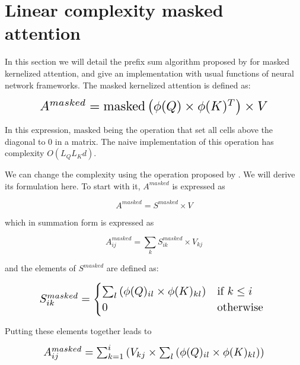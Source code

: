 \section{Linear complexity masked attention}

In this section we will detail the prefix sum algorithm proposed by
\citet{choromanski2021rethinking} for
 masked kernelized attention, and give an implementation with usual
functions of neural network frameworks. The masked kernelized attention is defined as:

\begin{equation}
\resizebox{0.8\hsize}{!}{$
	A^{masked} = \mathrm{masked} \left( \phi(Q) \times \phi(K)^T \right) \times V
$}
\end{equation}

In this expression, $\mathrm{masked}$ being the operation that set all cells
 above the diagonal to 0 in a matrix. The naive implementation of this
 operation has complexity $O(L_QL_Kd)$.

We can change the complexity using the operation proposed by
 \citet{choromanski2021rethinking}. We
 will derive its formulation here.
 To start with it, $A^{masked}$ is expressed as

\begin{equation}
A^{masked} = S^{masked} \times V
\end{equation}

\noindent{}which
in summation form is expressed as

\begin{equation}
A^{masked}_{ij} = \sum_k S^{masked}_{ik} \times V_{kj}
\end{equation}

\noindent{}and the
elements of $S^{masked}$ are defined as:

\begin{equation}
	\resizebox{0.8\hsize}{!}{$
		S^{masked}_{ik} =
		\begin{cases}
		\sum_l \left( \phi(Q)_{il} \times \phi(K)_{kl} \right) & \text{if } k \leq i\\
		0 & \text{otherwise} 
		\end{cases}$
	}
\end{equation}

Putting these elements together leads to

\begin{equation}
	\resizebox{0.8\hsize}{!}{
		$A^{masked}_{ij}= \sum_{k=1}^i \left( V_{kj} \times \sum_l \left( \phi(Q)_{il} \times \phi(K)_{kl} \right) \right)$
	}
\end{equation}

